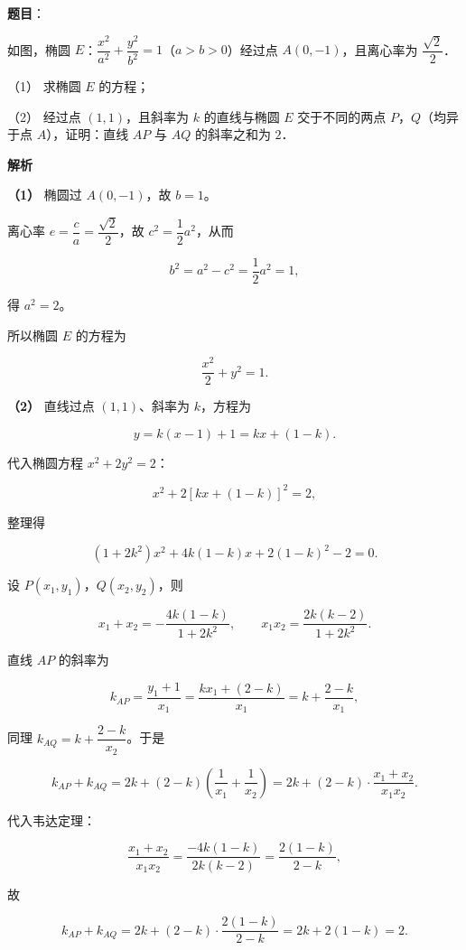 \begin{answer}

\textbf{题目}：

如图，椭圆 $E$：$\dfrac{x^{2}}{a^{2}}+\dfrac{y^{2}}{b^{2}}=1$（$a>b>0$）经过点 $A(0,-1)$，且离心率为 $\dfrac{\sqrt{2}}{2}$．

（1） 求椭圆 $E$ 的方程；

（2） 经过点 $(1,1)$，且斜率为 $k$ 的直线与椭圆 $E$ 交于不同的两点 $P$，$Q$（均异于点 $A$），证明：直线 $AP$ 与 $AQ$ 的斜率之和为 $2$．
\nopagebreak[4]
\begin{center}\end{center}
\nopagebreak[4]
\textbf{解析}

\textbf{（1）} 椭圆过 $A(0,-1)$，故 $b=1$。

离心率 $e=\dfrac{c}{a}=\dfrac{\sqrt{2}}{2}$，故 $c^{2}=\dfrac{1}{2}a^{2}$，从而

\nopagebreak[4]
\[
b^{2}=a^{2}-c^{2}=\frac{1}{2}a^{2}=1,
\]

得 $a^{2}=2$。

所以椭圆 $E$ 的方程为

\nopagebreak[4]
\[
\frac{x^{2}}{2}+y^{2}=1.
\]

\textbf{（2）} 直线过点 $(1,1)$、斜率为 $k$，方程为

\nopagebreak[4]
\[
y=k(x-1)+1=kx+(1-k).
\]

代入椭圆方程 $x^{2}+2y^{2}=2$：

\nopagebreak[4]
\[
x^{2}+2\left[kx+(1-k)\right]^{2}=2,
\]

整理得

\nopagebreak[4]
\[
(1+2k^{2})x^{2}+4k(1-k)x+2(1-k)^{2}-2=0.
\]

设 $P(x_{1},y_{1})$，$Q(x_{2},y_{2})$，则

\nopagebreak[4]
\[
x_{1}+x_{2}=-\frac{4k(1-k)}{1+2k^{2}},\qquad x_{1}x_{2}=\frac{2k(k-2)}{1+2k^{2}}.
\]

直线 $AP$ 的斜率为

\nopagebreak[4]
\[
k_{AP}=\frac{y_{1}+1}{x_{1}}=\frac{kx_{1}+(2-k)}{x_{1}}=k+\frac{2-k}{x_{1}},
\]

同理 $k_{AQ}=k+\dfrac{2-k}{x_{2}}$。于是

\nopagebreak[4]
\[
k_{AP}+k_{AQ}=2k+(2-k)\left(\frac{1}{x_{1}}+\frac{1}{x_{2}}\right)
=2k+(2-k)\cdot\frac{x_{1}+x_{2}}{x_{1}x_{2}}.
\]

代入韦达定理：

\nopagebreak[4]
\[
\frac{x_{1}+x_{2}}{x_{1}x_{2}}=\frac{-4k(1-k)}{2k(k-2)}=\frac{2(1-k)}{2-k},
\]

故

\nopagebreak[4]
\[
k_{AP}+k_{AQ}=2k+(2-k)\cdot\frac{2(1-k)}{2-k}=2k+2(1-k)=2.
\]



\end{answer}
